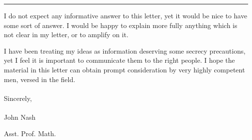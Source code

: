 \documentclass[11pt]{article}
\begin{document}
\begin{center}
\rule{4cm}{0.4pt}
\end{center}

I do not expect any informative answer to this letter, yet it would be nice to have some sort of answer.  I would be happy to explain more fully anything which is not clear in my letter, or to amplify on it.

I  have  been  treating  my  ideas  as  information  deserving  some  secrecy  precautions, yet I feel it is important to communicate them to the right people.  I hope the material in this letter can obtain prompt consideration by very highly competent men, versed in the field.
\\
\\
\noindent Sincerely,
\\
\\
\noindent John Nash

\noindent Asst. Prof. Math.
\end{document}
